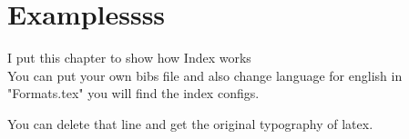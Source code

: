 
\section{Examplessss}

I put this chapter to show how Index works\\

You can put your own bibs file and also change language for english in "Formats.tex" you will find the index configs.\\

\lipsum[1-6]





You can delete that line and get the original typography of latex.